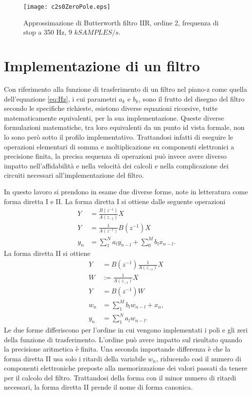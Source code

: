 \begin{figure}%
\centering    
\texttt{[image: c2s0ZeroPole.eps]}
\caption[Filtro nel piano-z: poli e zeri]
{ Approssimazione di Butterworth filtro IIR, ordine 2, frequenza di stop a 350 Hz, 9 $kSAMPLES/s$. }
\label{fig:c2s0ZeroPole}
\end{figure}




\section{Implementazione di un filtro}

Con riferimento alla funzione di trasferimento di un filtro nel piano-z come quella dell'equazione \ref{eq:Hz}, i cui parametri $a_{k}$ e $b_{k}$, sono il frutto del disegno del filtro secondo le specifiche richieste, esistono diverse equazioni ricorsive, tutte matematicamente equivalenti, per la sua implementazione. Queste diverse formulazioni matematiche, tra loro equivalenti da un punto id vista formale, non lo sono però sotto il profilo implementativo. Trattandosi infatti di eseguire le operazioni elementari di somma e moltiplicazione su componenti elettronici a precisione finita, la precisa sequenza di operazioni può invece avere diverso impatto nell'affidabilità e nella velocità dei calcoli e nella complicazione dei circuiti necessari all'implementazione del filtro.

In questo lavoro si prendono in esame due diverse forme, note in letteratura come forma diretta I e II. La forma diretta I si ottiene dalle seguente operazioni
\begin{align}
Y     &= \frac{B(z^{-1})}{A(z_{-1})}X \\
Y     &= \frac{1}{A(z^{-1})}B(z^{-1})X    \\
y_{n} &= \sum_{1}^{N} a_{l}y_{n-l} + \sum_{0}^{M} b_{l}x_{n-l}.
\end{align}
La forma diretta II si ottiene
\begin{align}
Y     &=  B(z^{-1})\frac{1}{A(z_{-1})}X \\
W     &:= \frac{1}{A(z_{-1})}X        \\
Y     &= B(z^{-1})W \\
w_{n} &= \sum_{1}^{M} b_{l}w_{n-l} + x_{n},  \\
y_n   &= \sum_{1}^{N} a_{l}w_{n-l}. 
\end{align}
%
Le due forme differiscono per l'ordine in cui vengono implementati i poli e gli zeri della funzione di trasferimento. L'ordine può avere impatto sul risultato quando la precisione aritmetica è finita.
Una seconda importande differenza è che la forma diretta II usa solo i ritardi della variabile $w_{n}$, riducendo così il numero di componenti elettroniche preposte alla memorizzazione dei valori passati da tenere per il calcolo del filtro. Trattandosi della forma con il minor numero di ritardi necessari, la forma diretta II prende il nome di forma canonica.

